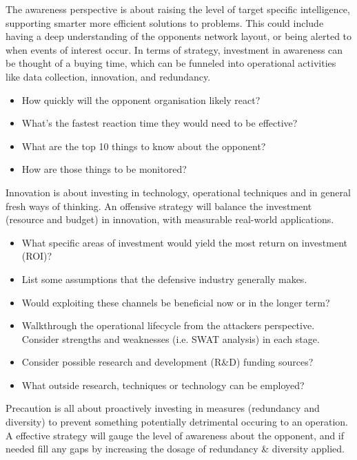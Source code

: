 \documentclass[11pt]{report}
\begin{document}
The awareness perspective is about raising the level of target specific intelligence, supporting smarter more efficient solutions to problems. This could include having a deep understanding of the opponents network layout, or being alerted to when events of interest occur. In terms of strategy, investment in awareness can be thought of a buying time, which can be funneled into operational activities like data collection, innovation, and redundancy.

\begin{itemize}
	\item How quickly will the opponent organisation likely react?
	\item What’s the fastest reaction time they would need to be effective?
	\item What are the top 10 things to know about the opponent?
	\item How are those things to be monitored?
\end{itemize}

Innovation is about investing in technology, operational techniques and in general fresh ways of thinking. An offensive strategy will balance the investment (resource and budget) in innovation, with measurable real-world applications.

\begin{itemize}
	\item What specific areas of investment would yield the most return on investment (ROI)?
	\item List some assumptions that the defensive industry generally makes.
	\item Would exploiting these channels be beneficial now or in the longer term?
	\item Walkthrough the operational lifecycle from the attackers perspective. Consider strengths and weaknesses (i.e. SWAT analysis) in each stage.
	\item Consider possible research and development (R\&D) funding sources?
	\item What outside research, techniques or technology can be employed?
\end{itemize}

Precaution is all about proactively investing in measures (redundancy and diversity) to prevent something potentially detrimental occuring to an operation. A effective strategy will gauge the level of awareness about the opponent, and if needed fill any gaps by increasing the dosage of redundancy \& diversity applied.
\end{document}

